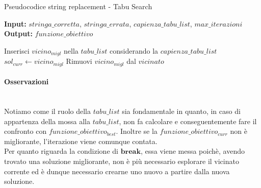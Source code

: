 \begin{algorithm}[!h]
    \captionsetup{labelformat=empty}
    \caption{Pseudocodice string replacement - Tabu Search}
    \vspace{0.1cm}
    \hspace*{\algorithmicindent} \textbf{Input:} {$stringa\_corretta$}, {$stringa\_errata$}, {$capienza\_tabu\_list$}, {$max\_iterazioni$}\\
    \hspace*{\algorithmicindent} \textbf{Output:} {$funzione\_obiettivo$}
    \begin{algorithmic}[1]
                        \State Inserisci {$vicino_{migl}$} nella {$tabu\_list$} considerando la {$capienza\_tabu\_list$}
                        \State $sol_{curr} \gets vicino_{migl}$
                    \EndIf
                \EndIf
                \State Rimuovi {$vicino_{migl}$} dal {$vicinato$}
            \EndWhile
        \EndWhile
        \State {}
        \EndProcedure
    \end{algorithmic}
\end{algorithm}

\noindent \paragraph{Osservazioni}\hfill\\
Notiamo come il ruolo della {$tabu\_list$} sia fondamentale in quanto, in caso di appartenza della mossa alla {$tabu\_list$}, non fa calcolare e
conseguentemente fare il confronto con {$funzione\_obiettivo_{best}$}. Inoltre se la {$funzione\_obiettivo_{curr}$} non è migliorante, l'iterazione
viene comunque contata.\\
Per quanto riguarda la condizione di {$\textbf{break}$}, essa viene messa poichè, avendo trovato una soluzione migliorante, non è più necessario
esplorare il vicinato corrente ed è dunque necessario crearne uno nuovo a partire dalla nuova soluzione.\\

